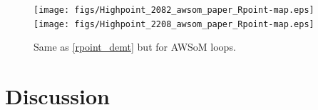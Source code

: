 \documentclass[namedreferences]{solarphysics}
\begin{document}
\begin{article}
\begin{figure}%
\begin{center}
\texttt{[image: figs/Highpoint\_2082\_awsom\_paper\_Rpoint-map.eps]}
\texttt{[image: figs/Highpoint\_2208\_awsom\_paper\_Rpoint-map.eps]}
\caption{Same as \ref{rpoint_demt} but for AWSoM loops.}
\label{rpoint_awsom}
\end{center}
\end{figure} 


\section{Discussion}\label{discu} 
%



%
  

%



%
%


%
%
% 
%   
%
%
%   
%  

\end{article} 
\end{document}
